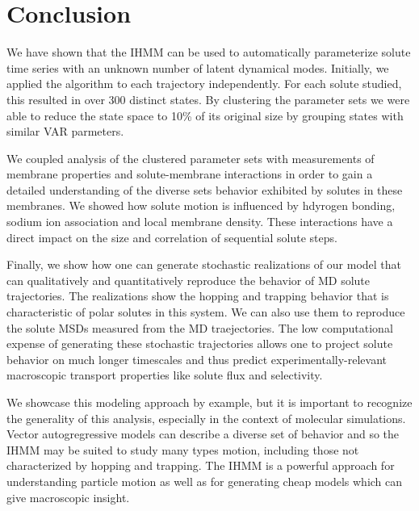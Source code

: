 \documentclass{article}
\begin{document}
  
  \section{Conclusion}
  
  We have shown that the IHMM can be used to automatically parameterize solute 
  time series with an unknown number of latent dynamical modes. Initially, we applied
  the algorithm to each trajectory independently. For each solute studied, this resulted
  in over 300 distinct states. By clustering the parameter sets we were able to reduce 
  the state space to 10\% of its original size by grouping states with similar VAR
  parmeters.
  
  We coupled analysis of the clustered parameter sets with measurements of membrane 
  properties and solute-membrane interactions in order to gain a detailed understanding
  of the diverse sets behavior exhibited by solutes in these membranes. We showed how
  solute motion is influenced by hdyrogen bonding, sodium ion association and local
  membrane density. These interactions have a direct impact on the size and
  correlation of sequential solute steps.
  
  Finally, we show how one can generate stochastic realizations of our model that
  can qualitatively and quantitatively reproduce the behavior of MD solute 
  trajectories. The realizations show the hopping and trapping behavior that is
  characteristic of polar solutes in this system. We can also use them to reproduce
  the solute MSDs measured from the MD traejectories. The low computational expense 
  of generating these stochastic trajectories allows one to project solute behavior
  on much longer timescales and thus predict experimentally-relevant macroscopic 
  transport properties like solute flux and selectivity.
  
  We showcase this modeling approach by example, but it is important to
  recognize the generality of this analysis, especially in the context of molecular
  simulations. Vector autogregressive models can describe a diverse set of behavior
  and so the IHMM may be suited to study many types motion, including those not 
  characterized by hopping and trapping. The IHMM is a powerful approach for 
  understanding particle motion as well as for generating cheap models
  which can give macroscopic insight.
  
\end{document}
